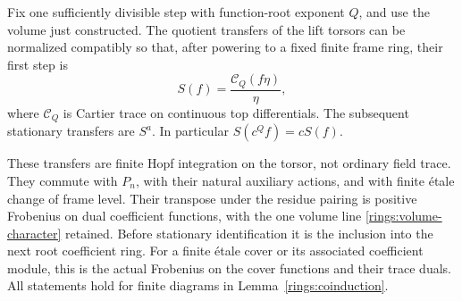 \begin{lemma}
\label{lem:cartier-transfer}
Fix one sufficiently divisible step with function-root
exponent $Q$, and use the volume just constructed.
The quotient transfers of the lift torsors can be
normalized compatibly so that, after powering to a
fixed finite frame ring, their first step is
\begin{equation}\label{rings:stationary-c}
 S(f)=\frac{\mathscr C_Q(f\eta)}{\eta},
\end{equation}
where $\mathscr C_Q$ is Cartier trace on continuous
top differentials.  The subsequent stationary
transfers are $S^a$.  In particular
$S(c^Qf)=cS(f)$.

These transfers are finite Hopf integration on the
torsor, not ordinary field trace.  They commute
with $P_n$, with their natural auxiliary actions,
and with finite \'etale change of frame level.
Their transpose under the residue pairing is
positive Frobenius on dual coefficient functions,
with the one volume line \eqref{rings:volume-character}
retained.  Before stationary identification it is
the inclusion into the next root coefficient ring.
For a finite \'etale cover or its associated
coefficient module, this is the actual Frobenius
on the cover functions and their trace duals.
All statements hold for finite diagrams in
Lemma~\ref{rings:coinduction}.
\end{lemma}


